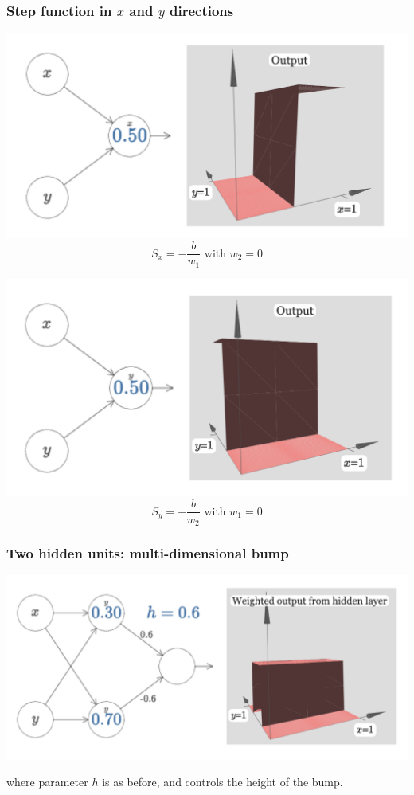 \documentclass[usenames,dvipsnames]{beamer}
\begin{document}
\begin{frame}
  \frametitle{Step function in $x$ and $y$ directions}
  
    \begin{minipage}[c]{.45\textwidth}
	\centering
	\includegraphics[scale=.3]{multi-step-x}
	\[ S_x = -\frac{b}{w_1} \text{ with } w_2=0 \]
\end{minipage} \hfill \begin{minipage}[c]{.45\textwidth}
\includegraphics[scale=.3]{multi-step-y}
\[ S_y = -\frac{b}{w_2} \text{ with } w_1=0 \]
\end{minipage}
  
\end{frame}




\begin{frame}
  \frametitle{Two hidden units: multi-dimensional bump}
  
  \centering
  \includegraphics[scale=.4]{multi-bump}

\flushleft
where parameter $h$ is as before, and controls the height of the bump.
  
\end{frame}
\end{document}
